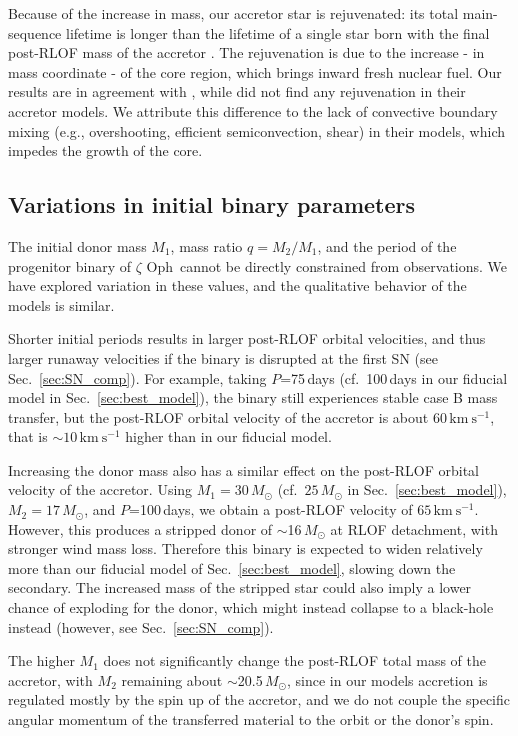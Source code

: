 \documentclass[twocolumn,twocolappendix,trackchanges]{aastex63}
\newcommand{\kms}{{\mathrm{km\ s^{-1}}}}
\DeclareRobustCommand{\Secref}[1]{Sec.~\ref{#1}}
\newcommand{\zoph}{$\zeta$ Oph}
\begin{document}
Because of the increase in mass, our accretor star is rejuvenated: its
total main-sequence lifetime is longer than the lifetime of a single
star born with the final post-RLOF mass of the accretor
\citep[e.g.,][]{schneider:16}. The rejuvenation is due to the increase
- in mass coordinate - of the core region, which brings inward fresh
nuclear fuel. Our results are in agreement with \cite{hellings:83},
while \cite{braun:95} did not find any rejuvenation in their accretor
models. We attribute this difference to the lack of convective
boundary mixing (e.g., overshooting, efficient semiconvection, shear)
in their models, which impedes the growth of the core.


\subsection{Variations in initial binary parameters}
\label{sec:bin_init}

The initial donor mass $M_1$, mass ratio $q=M_2/M_1$, and the period
of the progenitor binary of \zoph\ cannot be directly constrained from
observations. We have explored variation in these values, and the
qualitative behavior of the models is similar.

Shorter initial periods results in larger post-RLOF orbital
velocities, and thus larger runaway velocities if the binary is
disrupted at the first SN (see \Secref{sec:SN_comp}). For example, taking $P$=75\,days
(cf.~100\,days in our fiducial model in \Secref{sec:best_model}), the
binary still experiences stable case B mass transfer, but the
post-RLOF orbital velocity of the accretor is about $60\,\kms$, that
is $\sim$$10\,\kms$ higher
than in our fiducial model.

Increasing the donor mass also has a similar effect on the post-RLOF orbital velocity of the accretor. Using
$M_1=30\,M_\odot$ (cf.\ $25\,M_\odot$ in \Secref{sec:best_model}),
$M_2=17\,M_\odot$, and
$P$=100\,days, we obtain a post-RLOF velocity of
$65\,\kms$. However, this produces a stripped donor of
$\sim$16\,$M_\odot$ at RLOF detachment, with stronger wind mass loss. Therefore this binary is expected to widen relatively more than our fiducial model of \Secref{sec:best_model}, slowing down the secondary. The increased mass of the stripped star could also imply a lower chance of exploding for the donor, which might instead collapse to a black-hole instead (however, see \Secref{sec:SN_comp}).

The higher $M_1$ does not significantly change the post-RLOF total
mass of the accretor, with $M_2$ remaining about $\sim$20.5\,$M_\odot$, since
in our models accretion is regulated mostly by the spin up of the
accretor, and we do not couple the specific angular momentum of the transferred
material to the orbit or the donor's spin.
\end{document}
